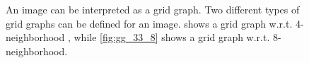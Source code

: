 \begin{figure}
  \begin{center}
  \hspace{1cm}
  \hspace{1cm}
  \end{center}
  \caption[An image treaded as grid graph]{
  An image  can be interpreted as a grid graph. 
  Two different types of grid graphs can be defined for an image.
   shows a grid graph w.r.t. 4-neighborhood , while
  \cref{fig:gg_33_8} shows a grid graph w.r.t. 8-neighborhood.  
  }\label{fig:grid_graph}
\end{figure}


